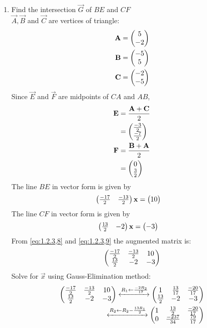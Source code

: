 \documentclass[11pt]{book}
\begin{document}
\begin{enumerate}[label=\thesection.\arabic*.,ref=\thesection.\theenumi]
\item Find the intersection $\vec{G}$ of $BE$ and $CF$
\\ 
\solution 
$\vec{A},\vec{B}$ and $\vec{C}$ are vertices of triangle:
\begin{align}
    \mathbf{A} &= \begin{pmatrix}5 \\-2\end{pmatrix} \\
    \mathbf{B} &= \begin{pmatrix}-5 \\ 5\end{pmatrix} \\
    \mathbf{C} &= \begin{pmatrix}-2 \\-5\end{pmatrix}
\end{align}
Since $\vec{E}$ and $\vec{F}$ are midpoints of $CA$ and $AB$,
\begin{align}
    \mathbf{E} &= \frac{\mathbf{A} + \mathbf{C}}{2} \\
	&= \begin{pmatrix}\frac{-3}{2} \\ \frac{-7}{2}\end{pmatrix}\\
    \mathbf{F} &= \frac{\mathbf{B} + \mathbf{A}}{2} \\ 
    &= \begin{pmatrix} 0 \\ \frac{3}{2}\end{pmatrix}
\end{align}
The line $BE$ in vector form is given by
\begin{align}
\myvec{\frac{-17}{2} & \frac{-13}{2}} \vec{x} &= \myvec{10}
\label{eq:1.2.3,8}
\end{align}
The line $CF$ in vector form is given by
\begin{align}
\myvec{ \frac{13}{2} & -2} \vec{x} &= \myvec{-3}
\label{eq:1.2.3,9}
\end{align}
From \eqref{eq:1.2.3,8} and \eqref{eq:1.2.3,9} the augmented matrix is:
\begin{align}
\begin{pmatrix}
\frac{-17}{2} & \frac{-13}{2} & 10 \\
\frac{13}{2} & -2 & -3
\end{pmatrix}
\end{align}
Solve for $\vec{x}$ using Gauss-Elimination method:
\begin{align}
    \label{eq:matrowoperations}
 \myvec{
\frac{-17}{2} & \frac{-13}{2} & 10 \\
\frac{13}{2} & -2 & -3
}
\xleftrightarrow[]{R_1 \leftarrow \frac{-2R_2}{17}}
    \myvec{
    1 & \frac{13}{17} & \frac{-20}{17}
    \\
    \frac{13}{2} & -2 & -3 
    }
    \\
     \xleftrightarrow[]{R_2\leftarrow R_2-\frac{13R_1}{2}}
    \myvec{
    1 & \frac{13}{2} & \frac{-20}{17}
    \\
    0 & \frac{-237}{34} & \frac{79}{17} 
    }
    \\

\end{align}
\end{enumerate}
\end{document}
